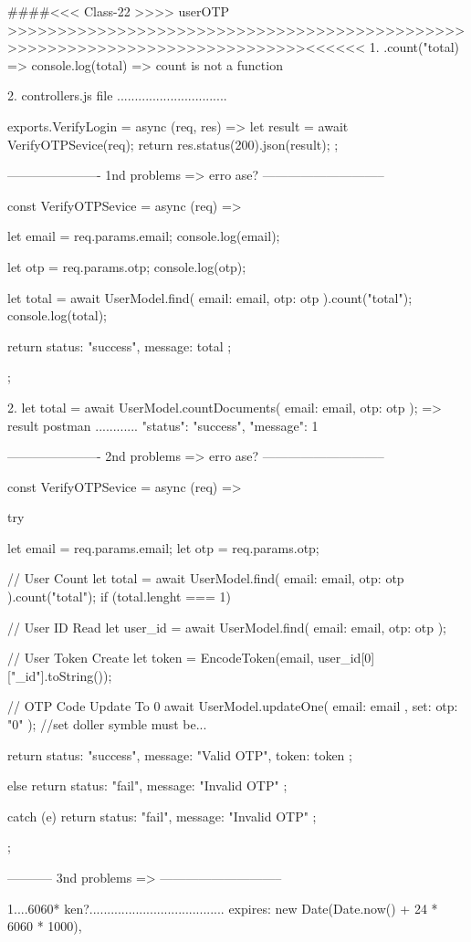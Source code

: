 ####<<< Class-22 >>>> userOTP >>>>>>>>>>>>>>>>>>>>>>>>>>>>>>>>>>>>>>>>>>>>>>>>>>>>>>>>>>>>>>>>>>>>>>>>>>>><<<<<<
1. .count("total) => console.log(total)  => count is not a function

2. controllers.js file ...............................

exports.VerifyLogin = async (req, res) => {
    let result = await VerifyOTPSevice(req);
    return res.status(200).json(result);
  };

---------------------- 1nd problems => erro ase? -----------------------------

const VerifyOTPSevice = async (req) => {
  let email = req.params.email;
  console.log(email);

  let otp = req.params.otp;
  console.log(otp);

  let total = await UserModel.find({ email: email, otp: otp }).count("total");
  console.log(total);

  return { status: "success", message: total };
};


2.   let total = await UserModel.countDocuments({ email: email, otp: otp });
     => result postman ............
     {
    "status": "success",
    "message": 1
     }


---------------------- 2nd problems => erro ase? -----------------------------

const VerifyOTPSevice = async (req) => {
  try {
    let email = req.params.email;
    let otp = req.params.otp;

    // User Count
    let total = await UserModel.find({ email: email, otp: otp }).count("total");
    if (total.lenght === 1) {
      // User ID Read
      let user_id = await UserModel.find({ email: email, otp: otp });

      // User Token Create
      let token = EncodeToken(email, user_id[0]["_id"].toString());

      // OTP Code Update To 0
      await UserModel.updateOne({ email: email }, { set: { otp: "0" } }); //set doller symble must be...

      return { status: "success", message: "Valid OTP", token: token };
    } else {
      return { status: "fail", message: "Invalid OTP" };
    }
  } catch (e) {
    return { status: "fail", message: "Invalid OTP" };
  }
};

----------- 3nd problems =>  -----------------------------

1....6060* ken?......................................
expires: new Date(Date.now() + 24 * 6060 * 1000),

